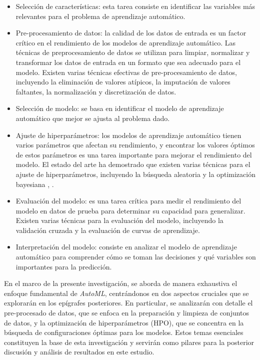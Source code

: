 \begin{itemize}
	\item Selección de características: esta tarea consiste en identificar las variables más relevantes para el problema de aprendizaje automático. 
	\item Pre-procesamiento de datos: la calidad de los datos de entrada es un factor crítico en el rendimiento de los modelos de aprendizaje automático. Las técnicas de preprocesamiento de datos se utilizan para limpiar, normalizar y transformar los datos de entrada en un formato que sea adecuado para el modelo. Existen varias técnicas efectivas de pre-procesamiento de datos, incluyendo la eliminación de valores atípicos, la imputación de valores faltantes, la normalización y discretización de datos.
	\item Selección de modelo: se basa en identificar el modelo de aprendizaje automático que mejor se ajusta al problema dado.
	\item Ajuste de hiperparámetros: los modelos de aprendizaje automático tienen varios parámetros que afectan su rendimiento, y encontrar los valores óptimos de estos parámetros es una tarea importante para mejorar el rendimiento del modelo. El estado del arte ha demostrado que existen varias técnicas para el ajuste de hiperparámetros, incluyendo la búsqueda aleatoria \citep{zoller2021benchmark} y la optimización bayesiana \citep{he2021automl}, \citep{hutter2019automated}.
	\item Evaluación del modelo: es una tarea crítica para medir el rendimiento del modelo en datos de prueba para determinar su capacidad para generalizar. Existen varias técnicas para la evaluación del modelo, incluyendo la validación cruzada y la evaluación de curvas de aprendizaje.
	\item Interpretación del modelo: consiste en analizar el modelo de aprendizaje automático para comprender cómo se toman las decisiones y qué variables son importantes para la predicción.
\end{itemize}

En el marco de la presente investigación, se aborda de manera exhaustiva el enfoque fundamental de \textit{AutoML}, centrándonos en dos aspectos cruciales que se explorarán en los epígrafes posteriores. En particular, se analizarán con detalle el pre-procesado de datos, que se enfoca en la preparación y limpieza de conjuntos de datos, y la optimización de hiperparámetros (HPO), que se concentra en la búsqueda de configuraciones óptimas para los modelos. Estos temas esenciales constituyen la base de esta investigación y servirán como pilares para la posterior discusión y análisis de resultados en este estudio. 

